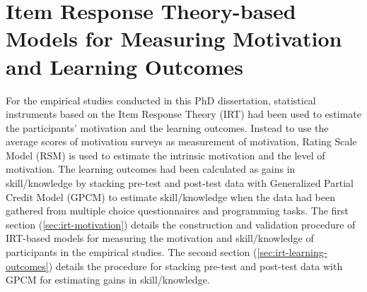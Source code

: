 
\chapter[IRT-based Models for Measuring Motivation and Learning Outcomes]{Item Response Theory-based Models for Measuring Motivation and Learning Outcomes}
\label{appendix:irt-models}

For the empirical studies conducted in this PhD dissertation, statistical instruments based on the Item Response Theory (IRT) had been used to estimate the participants' motivation and the learning outcomes. Instead to use the average scores of motivation surveys as measurement of motivation, Rating Scale Model (RSM) is used to estimate the intrinsic motivation and the level of motivation. The learning outcomes had been calculated as gains in skill/knowledge by stacking pre-test and post-test data with Generalized Partial Credit Model (GPCM) to estimate skill/knowledge when the data had been gathered from multiple choice questionnaires and programming tasks. The first section (\autoref{sec:irt-motivation}) details the construction and validation procedure of IRT-based models for measuring the motivation and skill/knowledge of participants in the empirical studies. The second section (\autoref{sec:irt-learning-outcomes}) details the procedure for stacking pre-test and post-test data with GPCM for estimating gains in skill/knowledge.

